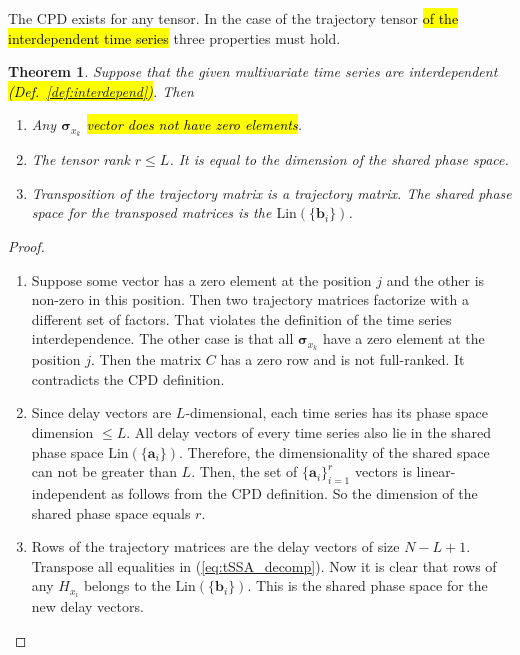\documentclass[referee, pdflatex, sn-mathphys-num]{sn-jnl}
\theoremstyle{definition}
\theoremstyle{plain}
\newtheorem{Th}{Theorem}
\begin{document}
	The CPD exists for any tensor. In the case of the trajectory tensor \hl{of the interdependent time series} three properties must hold.
	
	\begin{Th}\label{th:cpd_phase}
		Suppose that the given multivariate time series are interdependent \hl{(Def.~{\ref{def:interdepend}})}. Then
		
		\begin{enumerate}
			\item Any $ \boldsymbol{\sigma}_{x_k} $ \hl{vector does not have zero elements}.
			\item The tensor rank $ r \le L $. It is equal to the dimension of the shared phase space.
			\item Transposition of the trajectory matrix is a trajectory matrix. The shared phase space for the transposed matrices is the $ \text{Lin}(\{\mathbf{b}_i\}) $.
		\end{enumerate}
	\end{Th}
	
	\begin{proof}
		\begin{enumerate}
			\item Suppose some vector has a zero element at the position $ j $ and the other is non-zero in this position. Then two trajectory matrices factorize with a different set of factors. That violates the definition of the time series interdependence. The other case is that all $ \boldsymbol{\sigma}_{x_k} $ have a zero element at the position $ j $. Then the matrix $ C $ has a zero row and is not full-ranked. It contradicts the CPD definition.
			\item Since delay vectors are $ L $-dimensional, each time series has its phase space dimension $ \le L $. All delay vectors of every time series also lie in the shared phase space $ \text{Lin}(\{\mathbf{a}_i\}) $. Therefore, the dimensionality of the shared space can not be greater than $ L $. Then, the set of $ \{\mathbf{a}_i\}_{i=1}^r $ vectors is linear-independent as follows from the CPD definition. So the dimension of the shared phase space equals $ r $.
			\item Rows of the trajectory matrices are the delay vectors of size $ N - L + 1 $. Transpose all equalities in (\ref{eq:tSSA_decomp}). Now it is clear that rows of any $ H_{x_i} $ belongs to the $ \text{Lin}(\{\mathbf{b}_i\}) $. This is the shared phase space for the new delay vectors.
		\end{enumerate}
	\end{proof}
\end{document}
